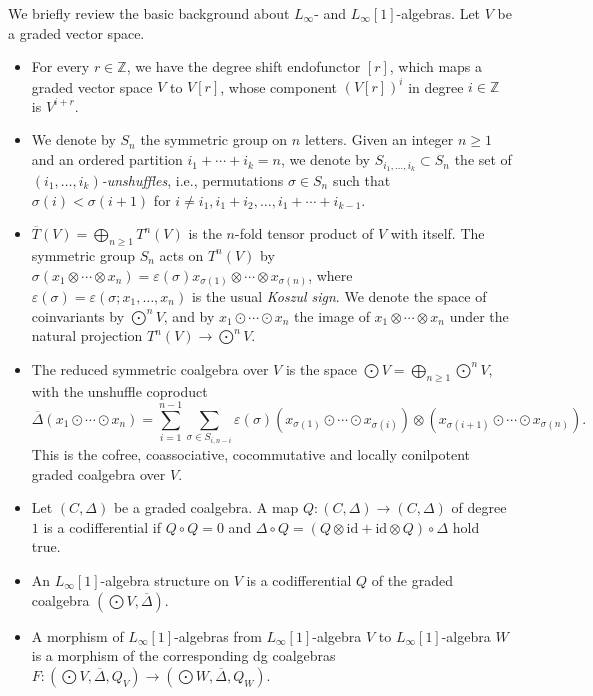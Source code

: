 \documentclass[11pt,thmsa]{amsart}
\theoremstyle{definition}
\begin{document}
We briefly review the basic background about $L_\infty$- and $L_\infty[1]$-algebras.
Let $V$ be a graded vector space.

\begin{itemize}
	\item For every $r\in \mathbb{Z}$, we have the degree shift endofunctor $[r]$, which maps a graded vector space $V$
	to $V[r]$, whose component $(V[r])^i$ in degree $i\in \mathbb{Z}$ is $V^{i+r}$.
	\item We denote by $S_n$ the symmetric group on $n$ letters. Given an integer $n\ge1$ and an ordered partition $i_1+\cdots+i_k=n$, we denote by $S_{i_1,\ldots,i_k}\subset S_n$ the set of \emph{$(i_1,\ldots,i_k)$-unshuffles}, i.e., permutations $\sigma\in S_n$ such that $\sigma(i)<\sigma(i+1)$ for $i\neq i_1, i_1+i_2,\ldots, i_1+\cdots+ i_{k-1}$.
	\item $\overline{T}(V)=\bigoplus_{n\ge 1}T^n(V)$ is the $n$-fold tensor product of $V$ with itself. The symmetric group $S_n$ acts on $T^n(V)$ by $\sigma(x_1\otimes\cdots\otimes x_n)=\varepsilon(\sigma)x_{\sigma(1)}\otimes\cdots\otimes x_{\sigma(n)}$, where $\varepsilon(\sigma)=\varepsilon(\sigma;x_1,\ldots,x_n)$ is the usual \emph{Koszul sign}. 
	We denote the space of coinvariants by $\bigodot^nV$, and by $x_1\odot\cdots\odot x_n$ the image of $x_1\otimes\cdots\otimes x_n$ under the natural projection $T^n(V)\to \bigodot^n V$. 
	\item The reduced symmetric coalgebra over $V$ is the space $\bigodot V =\bigoplus_{n\ge 1}\bigodot^n V$, with the unshuffle coproduct
	$$\overline{\Delta}(x_1\odot \cdots \odot x_n) = \sum_{i=1}^{n-1}\sum_{\sigma\in S_{i,n-i}}\varepsilon(\sigma)(x_{\sigma(1)}\odot \cdots \odot x_{\sigma(i)})\otimes (x_{\sigma(i+1)}\odot \cdots \odot x_{\sigma(n)}).$$
	This is the cofree, coassociative, cocommutative and locally conilpotent graded coalgebra over $V$.
	\item 
	Let $(C,\Delta)$ be a graded coalgebra.
	A map $Q: (C,\Delta)\to (C,\Delta)$ of degree $1$ is a codifferential if $Q\circ Q = 0$ and $\Delta \circ Q =(Q\otimes \mathrm{id} + \mathrm{id}\otimes Q)\circ \Delta$ hold true.
	\item An $L_\infty[1]$-algebra structure on $V$ is a codifferential $Q$
	of the graded coalgebra $(\bigodot V,\overline{\Delta})$.
	\item A morphism of $L_\infty[1]$-algebras from $L_\infty[1]$-algebra $V$ to $L_\infty[1]$-algebra $W$ is a morphism of the corresponding
	dg coalgebras $F: (\bigodot V,\overline{\Delta},Q_V) \to (\bigodot W,\overline{\Delta},Q_W)$.

\end{itemize}
\end{document}
